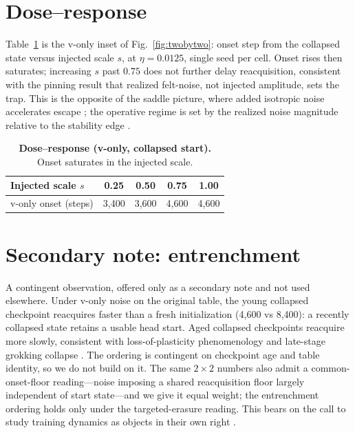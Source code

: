 \section{Dose--response}
\label{app:dose}
Table~\ref{tab:dose} is the v-only inset of Fig.~\ref{fig:twobytwo}: onset step
from the collapsed state versus injected scale $s$, at $\eta=0.0125$, single seed
per cell. Onset rises then saturates; increasing $s$ past $0.75$ does not further
delay reacquisition, consistent with the pinning result that realized felt-noise,
not injected amplitude, sets the trap. This is the opposite of the saddle picture,
where added isotropic noise accelerates escape \citep{saddle,zhu}; the operative
regime is set by the realized noise magnitude relative to the stability edge
\citep{wumae,eoss}.

\begin{table}[h]
\centering
\footnotesize
\begin{tabular}{@{}l c c c c@{}}
\toprule
Injected scale $s$ & 0.25 & 0.50 & 0.75 & 1.00 \\
\midrule
v-only onset (steps) & 3{,}400 & 3{,}600 & 4{,}600 & 4{,}600 \\
\bottomrule
\end{tabular}
\caption{\textbf{Dose--response (v-only, collapsed start).} Onset saturates in
the injected scale.}
\label{tab:dose}
\end{table}

\section{Secondary note: entrenchment}
\label{app:entrench}
A contingent observation, offered only as a secondary note and not used elsewhere.
Under v-only noise on the original table, the young collapsed checkpoint reacquires
faster than a fresh initialization (4{,}600 vs 8{,}400): a recently collapsed state
retains a usable head start. Aged collapsed checkpoints reacquire more slowly,
consistent with loss-of-plasticity phenomenology \citep{dohare} and late-stage
grokking collapse \citep{antigrok}. The ordering is contingent on checkpoint age
and table identity, so we do not build on it. The same $2\times2$ numbers also
admit a common-onset-floor reading---noise imposing a shared reacquisition floor
largely independent of start state---and we give it equal weight; the entrenchment
ordering holds only under the targeted-erasure reading. This bears on the call to
study training dynamics as objects in their own right \citep{position}.